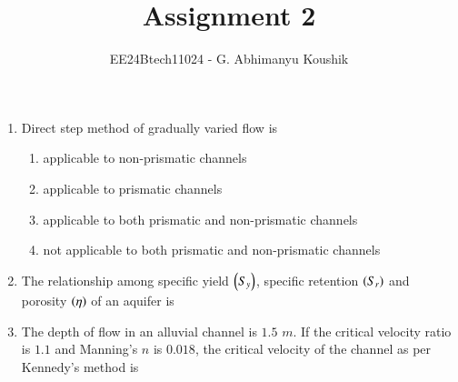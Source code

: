 \documentclass[journal,12pt,onecolumn]{IEEEtran}
\theoremstyle{remark}
\begin{document}
\title{Assignment 2}
\author{EE24Btech11024 - G. Abhimanyu Koushik}
\maketitle
\renewcommand{\thefigure}{\theenumi}
\renewcommand{\thetable}{\theenumi}
\begin{enumerate}

\item Direct step method of gradually varied flow is

\hfill{}
\begin{enumerate}
\item applicable to non-prismatic channels
\item applicable to prismatic channels
\item applicable to both prismatic and non-prismatic channels
\item not applicable to both prismatic and non-prismatic channels
\end{enumerate}

\item The relationship among specific yield $\left(S_y\right)$, specific retention $\left(S_r\right)$ and porosity $\left(\eta\right)$ of an aquifer is

\hfill{}
\begin{enumerate}
\end{enumerate}

\item The depth of flow in an alluvial channel is $1.5$ $m$. If the critical velocity ratio is $1.1$ and Manning's $n$ is $0.018$, the critical velocity of the channel as per Kennedy's method is

\hfill{}
\begin{enumerate}
\end{enumerate}


\end{enumerate}
\end{document}
